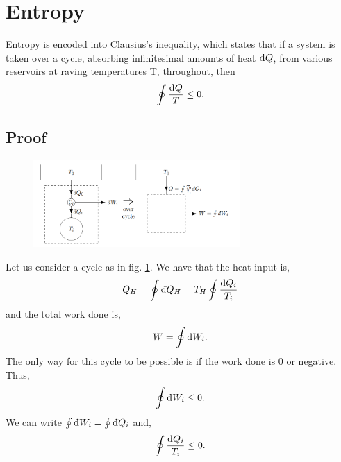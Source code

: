 \documentclass{book}
\newcommand{\dbar}{\mathrm{d}\hspace*{-0.08em}\bar{}\hspace*{0.1em}}
\begin{document}
\section{Entropy}
Entropy is encoded into Clausius's inequality, which states that if a system is taken over a cycle, absorbing infinitesimal amounts of heat $\dbar Q$, from various reservoirs at raving temperatures T, throughout, then
\begin{equation}
	\oint \frac{\dbar Q}{T} \leq 0.
\end{equation}
\subsection{Proof}
\begin{figure}
	\centering
	\includegraphics[width=0.7\textwidth]{clausius.png}
	\caption{}
	\label{fig:clausius}
\end{figure}
Let us consider a cycle as in fig. \ref{fig:clausius}. We have that the heat input is,
\begin{equation}
	Q_H = \oint\dbar Q_H = T_H \oint\frac{\dbar Q_i}{T_i}
\end{equation}
and the total work done is,
\begin{equation}
	W = \oint \dbar W_i.
\end{equation}
The only way for this cycle to be possible is if the work done is 0 or negative. Thus,
\begin{equation}
	\oint\dbar W_i \leq 0.
\end{equation}
We can write $\oint \dbar W_i = \oint \dbar Q_i$ and,
\begin{equation}
	\oint \frac{\dbar Q_i}{T_i} \leq 0.
\end{equation}
\end{document}
